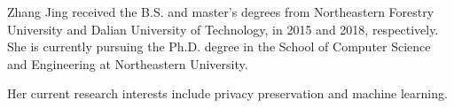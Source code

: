 \documentclass[10pt,journal,compsoc]{IEEEtran}
\begin{document}
	
	
	
	
	
	\begin{IEEEbiography}{Zhang Jing}
		received the B.S. and master’s degrees from Northeastern Forestry University and Dalian University of Technology, in 2015 and 2018, respectively. She is currently pursuing the Ph.D. degree in the School of Computer Science and Engineering at Northeastern University.
		
		Her current research interests include privacy preservation and machine learning.
	\end{IEEEbiography}
	
\end{document}
